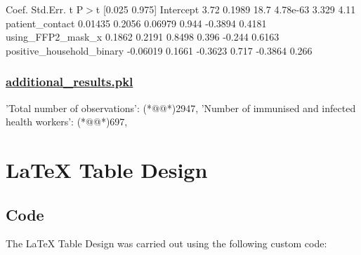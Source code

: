 \documentclass[11pt]{article}
\begin{document}
\begin{codeoutput}
                             Coef.  Std.Err.       t     P$>$\textbar{}t\textbar{}  [0.025  0.975]
Intercept                     3.72    0.1989    18.7  4.78e-63   3.329    4.11
patient\_contact            0.01435    0.2056 0.06979     0.944 -0.3894  0.4181
using\_FFP2\_mask\_x           0.1862    0.2191  0.8498     0.396  -0.244  0.6163
positive\_household\_binary -0.06019    0.1661 -0.3623     0.717 -0.3864   0.266
\end{codeoutput}\hypertarget{file-additional-results-pkl}{}

\subsubsection*{\hyperlink{code-Data Analysis-additional-results-pkl}{additional\_results.pkl}}

\begin{codeoutput}
{
    'Total number of observations': (*@@*)2947,
    'Number of immunised and infected health workers': (*@@*)697,
}
\end{codeoutput}

\section{LaTeX Table Design}
\subsection{{Code}}
The LaTeX Table Design was carried out using the following custom code:
\end{document}
